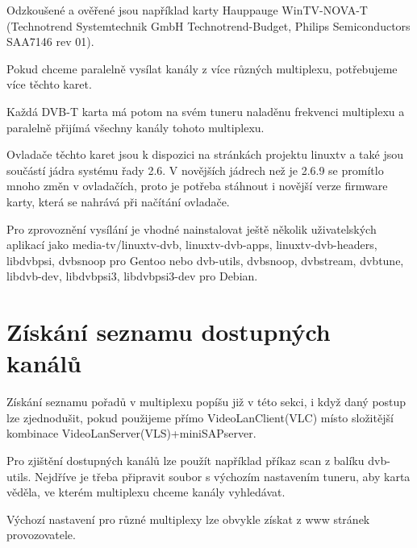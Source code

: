 Odzkoušené a ověřené jsou například karty Hauppauge WinTV-NOVA-T (Technotrend Systemtechnik GmbH Technotrend-Budget, Philips Semiconductors SAA7146 rev 01).

Pokud chceme paralelně vysílat kanály z více různých multiplexu, potřebujeme více těchto karet.

Každá DVB-T karta má potom na svém tuneru naladěnu frekvenci multiplexu a paralelně přijímá všechny kanály tohoto multiplexu.

\vspace{10pt}

Ovladače těchto karet jsou k dispozici na stránkách projektu linuxtv \cite{linuxtvURL} a také jsou součástí jádra systému řady 2.6. V novějších jádrech než je 2.6.9 se promítlo mnoho změn v ovladačích, proto je potřeba stáhnout i novější verze firmware karty, která se nahrává při načítání ovladače.

\vspace{10pt}

Pro zprovoznění vysílání je vhodné nainstalovat ještě několik uživatelských aplikací jako media-tv/linuxtv-dvb, linuxtv-dvb-apps, linuxtv-dvb-headers, libdvbpsi, dvbsnoop pro Gentoo nebo dvb-utils, dvbsnoop, dvbstream, dvbtune, libdvb-dev, libdvbpsi3, libdvbpsi3-dev pro Debian.

\section{Získání seznamu dostupných kanálů}

Získání seznamu pořadů v multiplexu popíšu již v této sekci, i když daný postup lze zjednodušit, pokud použijeme přímo VideoLanClient(VLC) místo složitější kombinace VideoLanServer(VLS)+miniSAPserver.

\vspace{10pt}

Pro zjištění dostupných kanálů lze použít například příkaz scan z balíku dvb-utils. Nejdříve je třeba připravit soubor s výchozím nastavením tuneru, aby karta věděla, ve kterém multiplexu chceme kanály vyhledávat.

\vspace{10pt}

Výchozí nastavení pro různé multiplexy lze obvykle získat z www stránek provozovatele.

\vspace{10pt}

